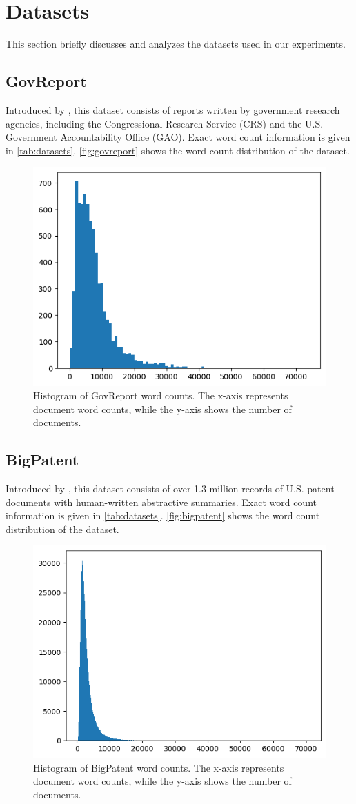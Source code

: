 \section{Datasets}
\label{sec:datasets}

This section briefly discusses and analyzes the datasets used in our experiments.


\subsection*{GovReport}

Introduced by \citet{huang-etal-2021-efficient}, this dataset consists of reports written by government research agencies, including the Congressional Research Service (CRS) and the U.S. Government Accountability Office (GAO).
Exact word count information is given in \autoref{tab:datasets}.
\autoref{fig:govreport} shows the word count distribution of the dataset.

\begin{figure}[!ht]
  \centering
  \includegraphics[width=.48\textwidth]{images/govreport-wordcount.png}
  \caption{
    Histogram of GovReport word counts.
    The x-axis represents document word counts, while the y-axis shows the number of documents.
  }
  \label{fig:govreport}
\end{figure}


\subsection*{BigPatent}

Introduced by \citet{sharma-etal-2019-bigpatent}, this dataset consists of over 1.3 million records of U.S. patent documents with human-written abstractive summaries.
Exact word count information is given in \autoref{tab:datasets}.
\autoref{fig:bigpatent} shows the word count distribution of the dataset.

\begin{figure}[!ht]
  \centering
  \includegraphics[width=.48\textwidth]{images/bigpatent-wordcount.png}
  \caption{
    Histogram of BigPatent word counts.
    The x-axis represents document word counts, while the y-axis shows the number of documents.
  }
  \label{fig:bigpatent}
\end{figure}


